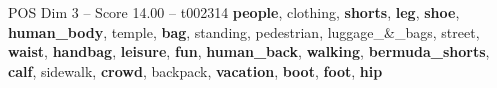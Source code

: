 \begin{textsample}{POS Dim 3 – Score 14.00 – t002314}  \label{ex:f3_pos_032}
\textbf{people}, clothing, \textbf{shorts}, \textbf{leg}, \textbf{shoe}, \textbf{human\_body}, temple, \textbf{bag}, standing, pedestrian, luggage\_\&\_bags, street, \textbf{waist}, \textbf{handbag}, \textbf{leisure}, \textbf{fun}, \textbf{human\_back}, \textbf{walking}, \textbf{bermuda\_shorts}, \textbf{calf}, sidewalk, \textbf{crowd}, backpack, \textbf{vacation}, \textbf{boot}, \textbf{foot}, \textbf{hip}

\end{textsample}
